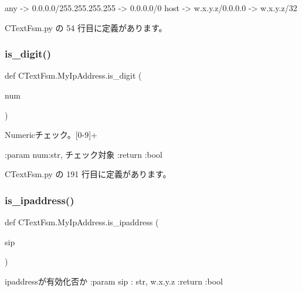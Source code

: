 \begin{DoxyVerb}any   -> 0.0.0.0/255.255.255.255 -> 0.0.0.0/0
host  -> w.x.y.z/0.0.0.0         -> w.x.y.z/32
\end{DoxyVerb}
 

 C\+Text\+Fsm.\+py の 54 行目に定義があります。

\mbox{\label{classCTextFsm_1_1MyIpAddress_aa0f274c5ef3ea6e3cf86f4a58469ab51}} 
\subsubsection{\texorpdfstring{is\_digit()}{is\_digit()}}
{\footnotesize\ttfamily def C\+Text\+Fsm.\+My\+Ip\+Address.\+is\+\_\+digit (\begin{DoxyParamCaption}\item[{}]{num }\end{DoxyParamCaption})\hspace{0.3cm}{\ttfamily [static]}}

\begin{DoxyVerb}Numericチェック。[0-9]+

:param num:str, チェック対象
:return :bool
\end{DoxyVerb}
 

 C\+Text\+Fsm.\+py の 191 行目に定義があります。

\mbox{\label{classCTextFsm_1_1MyIpAddress_aee7d732ce8da8657add80c4d3ec1cb0f}} 
\subsubsection{\texorpdfstring{is\_ipaddress()}{is\_ipaddress()}}
{\footnotesize\ttfamily def C\+Text\+Fsm.\+My\+Ip\+Address.\+is\+\_\+ipaddress (\begin{DoxyParamCaption}\item[{}]{sip }\end{DoxyParamCaption})\hspace{0.3cm}{\ttfamily [static]}}

\begin{DoxyVerb}ipaddressが有効化否か
:param sip : str, w.x.y.z
:return :bool
\end{DoxyVerb}
 

